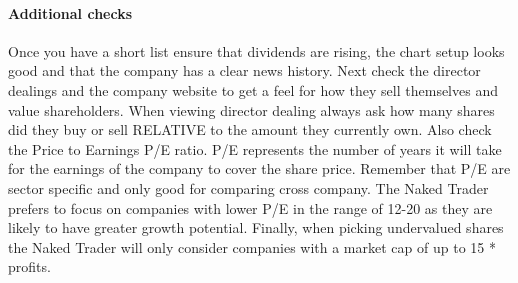 \paragraph{Additional checks}
Once you have a short list ensure that dividends are rising, the chart setup looks good and that the company has a clear news history.
Next check the director dealings and the company website to get a feel for how they sell themselves and value shareholders.
When viewing director dealing always ask how many shares did they buy or sell RELATIVE to the amount they currently own.
Also check the Price to Earnings P/E ratio.
P/E represents the number of years it will take for the earnings of the company to cover the share price.
Remember that P/E are sector specific and only good for comparing cross company. 
The Naked Trader prefers to focus on companies with lower P/E in the range of 12-20 as they are likely to have greater growth potential.
Finally, when picking undervalued shares the Naked Trader will only consider companies with a market cap of up to 15 * profits.




